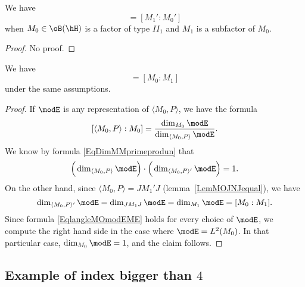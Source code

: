 \begin{corollary}
We have
\begin{equation}
	[M_0:M_1]=[M_1':M_0']
\end{equation}
when $M_0\in\oB(\hH)$ is a factor of type $II_1$ and $M_1$ is a subfactor of $M_0$.
\end{corollary}
\begin{proof}
No proof.
\end{proof}

\begin{theorem}
We have
\begin{equation}
	[ \langle M_0, P\rangle :M_0 ]=[M_0:M_1]
\end{equation}
under the same assumptions.
\end{theorem}

\begin{proof}
If $\modE$ is any representation of $\langle M_0, P\rangle $, we have the formula
\begin{equation}	\label{EqlangleMOmodEME}
	[\langle M_0, P\rangle :M_0]=\frac{ \dim_{M_0}\modE }{ \dim_{\langle M_0, P\rangle }\modE }.
\end{equation}
We know by formula \eqref{EqDimMMprimeprodun} that
\begin{equation}
	\Big( \dim_{\langle M_0, P\rangle }\modE \Big)\cdot \Big(  \dim_{\langle M_0, P\rangle '}\modE\Big)=1.
\end{equation}
On the other hand, since $\langle M_0, P\rangle =JM_1'J$ (lemma~\ref{LemMOJNJequal}), we have
\begin{equation}
	\dim_{\langle M_0, P\rangle '}\modE=\dim_{JM_1J}\modE=\dim_{M_1}\modE=[M_0:M_1].
\end{equation}
Since formula \eqref{EqlangleMOmodEME} holds for every choice of $\modE$, we compute the right hand side in the case where $\modE=L^2(M_0)$. In that particular case, $\dim_{M_0}\modE=1$, and the claim follows.
\end{proof}

					\subsection{Example of index bigger than \texorpdfstring{$4$}{4}}

